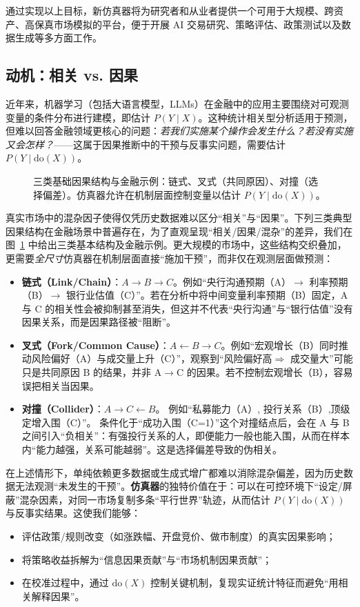 通过实现以上目标，新仿真器将为研究者和从业者提供一个可用于大规模、跨资产、高保真市场模拟的平台，便于开展 AI 交易研究、策略评估、政策测试以及数据生成等多方面工作。

\subsection{动机：相关 vs. 因果}
近年来，机器学习（包括大语言模型，LLMs）在金融中的应用主要围绕对可观测变量的条件分布进行建模，即估计 $P(Y\mid X)$。这种统计相关型分析适用于预测，但难以回答金融领域更核心的问题：\emph{若我们实施某个操作会发生什么？若没有实施又会怎样？}——这属于因果推断中的干预与反事实问题，需要估计 $P(Y\mid \mathrm{do}(X))$。

\begin{figure}[h]
  \centering
  
  \caption{三类基础因果结构与金融示例：链式、叉式（共同原因）、对撞（选择偏差）。仿真器允许在机制层面控制变量以估计 $P(Y\mid \mathrm{do}(X))$。}
  \label{fig:causal-patterns}
\end{figure}


真实市场中的混杂因子使得仅凭历史数据难以区分“相关”与“因果”。下列三类典型因果结构在金融场景中普遍存在，为了直观呈现“相关/因果/混杂”的差异，我们在图~\ref{fig:causal-patterns} 中给出三类基本结构及金融示例。更大规模的市场中，这些结构交织叠加，更需要\emph{全尺寸}仿真器在机制层面直接“施加干预”，而非仅在观测层面做预测：
\begin{itemize}
  \item \textbf{链式（Link/Chain）}：$A\to B\to C$。例如“央行沟通预期（A）$\to$ 利率预期（B）$\to$ 银行业估值（C）”。若在分析中将中间变量利率预期（B）固定，A 与 C 的相关性会被抑制甚至消失，但这并不代表“央行沟通”与“银行估值”没有因果关系，而是因果路径被“阻断”。
  \item \textbf{叉式（Fork/Common Cause）}：$A\leftarrow B\to C$。例如“宏观增长（B）同时推动风险偏好（A）与成交量上升（C）”，观察到“风险偏好高$\Rightarrow$ 成交量大”可能只是共同原因 B 的结果，并非 A$\to$C 的因果。若不控制宏观增长（B），容易误把相关当因果。
  \item \textbf{对撞（Collider）}：$A\to C\leftarrow B$。
  例如“私募能力（A）, 投行关系（B）,顶级定增入围（C）”。
  条件化于“成功入围（C=1）”这个对撞结点后，会在 A 与 B 之间引入“负相关”：有强投行关系的人，即便能力一般也能入围，从而在样本内“能力越强，关系可能越弱”。这是选择偏差导致的伪相关。
\end{itemize}

在上述情形下，单纯依赖更多数据或生成式增广都难以消除混杂偏差，因为历史数据无法观测“未发生的干预”。\textbf{仿真器}的独特价值在于：可以在可控环境下“设定/屏蔽”混杂因素，对同一市场复制多条“平行世界”轨迹，从而估计 $P(Y\mid \mathrm{do}(X))$ 与反事实结果。这使我们能够：
\begin{itemize}
  \item 评估政策/规则改变（如涨跌幅、开盘竞价、做市制度）的真实因果影响；
  \item 将策略收益拆解为“信息因果贡献”与“市场机制因果贡献”；
  \item 在校准过程中，通过 $\mathrm{do}(X)$ 控制关键机制，复现实证统计特征而避免“用相关解释因果”。
\end{itemize}




